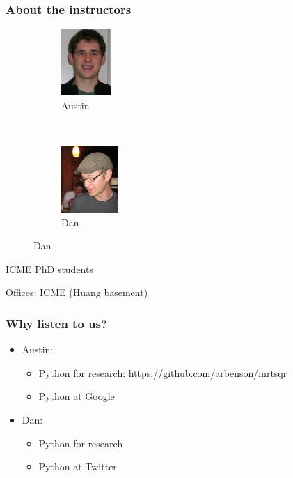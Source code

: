 \documentclass{beamer}
\begin{document}
\begin{frame}
\frametitle{About the instructors}

\begin{figure}
        \centering
	\begin{subfigure}[b]{0.45\textwidth}
	\centering
	\includegraphics[height=1in]{"images/austin"}
	\caption{Austin}
	\label{fig:hw2_15a}
	\end{subfigure}
        ~ %
	\begin{subfigure}[b]{0.45\textwidth}
	\centering
	\includegraphics[height=1in]{"images/dan"}
	\caption{Dan}
	\label{fig:hw2_15b}
	\end{subfigure}
\end{figure}

ICME PhD students

Offices: ICME (Huang basement)
\end{frame}

\begin{frame}
\frametitle{Why listen to us?}

\begin{itemize}
\setlength{\itemsep}{0.2in}
\item{Austin:
\begin{itemize}
\setlength{\itemsep}{0.05in}
\item{Python for research: \url{https://github.com/arbenson/mrtsqr}}
\item{Python at Google}
\end{itemize}
}
\item{Dan:
\begin{itemize}
\setlength{\itemsep}{0.05in}
\item{Python for research}
\item{Python at Twitter}
\end{itemize}
}
\end{itemize}

\end{frame}
\end{document}
